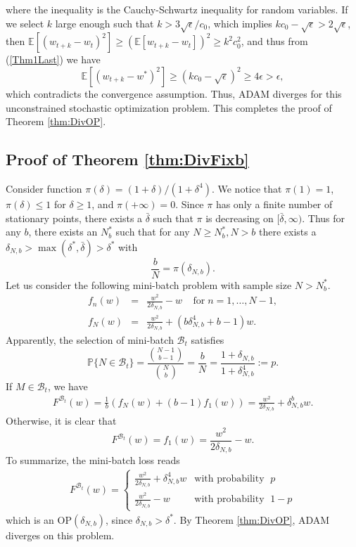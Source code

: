\documentclass[twoside]{article}
\def\EE{\mathbb{E}}
\def\PP{\mathbb{P}}
\def\BB{\mathcal{B}}
\begin{document}
where the inequality is the Cauchy-Schwartz inequality for random variables. If we select $k$ large enough such that $k>3\sqrt{\epsilon}/c_0$, which implies $kc_0-\sqrt{\epsilon}>2\sqrt{\epsilon}$, then $\EE[(w_{t+k} - w_t)^2]\geq (\EE[w_{t+k}-w_t])^2\geq k^2c_0^2$, and thus from (\ref{Thm1Last}) we have
\begin{equation*}
\EE\left[(w_{t+k}-w^*)^2\right] \geq (kc_0-\sqrt{\epsilon})^2 \geq 4\epsilon >\epsilon,
\end{equation*} 
which contradicts the convergence assumption. Thus, ADAM diverges for this unconstrained stochastic optimization problem. This completes the proof of Theorem \ref{thm:DivOP}.

\subsection{Proof of Theorem \ref{thm:DivFixb}}
Consider function $\pi(\delta) = (1+\delta)/(1+\delta^4)$. We notice that $\pi(1)=1$, $\pi(\delta)\leq 1$ for $\delta\geq 1$, and $\pi(+\infty)=0$. Since $\pi$ has only a finite number of stationary points, there exists a $\bar \delta$ such that $\pi$ is decreasing on $[\bar\delta,\infty)$. Thus for any $b$, there exists an $N^*_b$ such that for any $N\geq N^*_b, N>b$ there exists a $\delta_{N,b}>\max(\delta^*,\bar\delta)>\delta^*$ with 
\begin{equation*}
    \frac{b}{N} = \pi(\delta_{N,b}).
\end{equation*}
Let us consider the following mini-batch problem with sample size $N>N^*_b$.
\begin{eqnarray}
    f_n(w) &=& \frac{w^2}{2\delta_{N,b}} - w\;\;\;\;\text{for}\;n=1,\ldots, N-1,\nonumber\\
    f_N(w) &=& \frac{w^2}{2\delta_{N,b}} + (b\delta_{N,b}^4 + b-1)w.\nonumber
\end{eqnarray}
Apparently, the selection of mini-batch $\BB_t$ satisfies
$$\PP\{N\in\BB_t\} = \frac{\binom{N-1}{b-1}}{ \binom{N}{b} } = \frac{b}{N} = \frac{1+\delta_{N,b}}{1+\delta_{N,b}^4}:=p.$$
If $M\in\BB_t$, we have
\begin{eqnarray}
F^{\BB_t}(w) = \frac{1}{b}\left( f_{N}(w) + (b-1)f_{1}(w)\right) = \frac{w^2}{2\delta_{N,b}} +\delta_{N,b}^b w. \nonumber
\end{eqnarray}
Otherwise, it is clear that
$$F^{\BB_t}(w) = f_1(w) = \frac{w^2}{2\delta_{N,b}} - w.$$
To summarize, the mini-batch loss reads
\begin{eqnarray}
F^{\BB_t}(w) = \begin{cases}\frac{w^2}{2\delta_{N,b}} + \delta_{N,b}^4 w & \text{with probability } \;p\\
\frac{w^2}{2\delta_{N,b}} - w & \text{with probability }\; 1-p
\end{cases}\nonumber
\end{eqnarray}
which is an $\mathrm{OP}(\delta_{N,b})$, since $\delta_{N,b}>\delta^*$. By Theorem \ref{thm:DivOP}, ADAM diverges on this problem.
\end{document}
